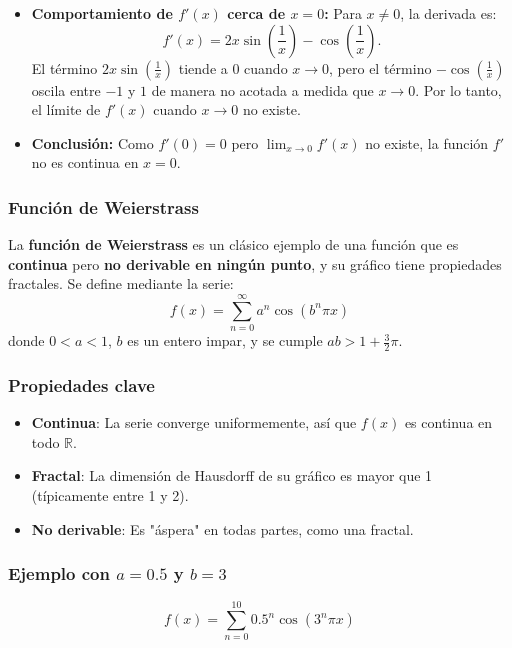 \documentclass[12pt, a4paper]{article}
\theoremstyle{rioplatense}
\begin{document}
\begin{itemize}
    \item \textbf{Comportamiento de \( f'(x) \) cerca de \( x = 0 \):}
    Para \( x \neq 0 \), la derivada es:
    \[
    f'(x) = 2x \sin\left(\frac{1}{x}\right) - \cos\left(\frac{1}{x}\right).
    \]
    El término \( 2x \sin\left(\frac{1}{x}\right) \) tiende a 0 cuando \( x \to 0 \), pero el término \( -\cos\left(\frac{1}{x}\right) \) oscila entre \(-1\) y \(1\) de manera no acotada a medida que \( x \to 0 \). Por lo tanto, el límite de \( f'(x) \) cuando \( x \to 0 \) no existe.

    \item \textbf{Conclusión:}
    Como \( f'(0) = 0 \) pero \( \lim_{x \to 0} f'(x) \) no existe, la función \( f' \) no es continua en \( x = 0 \).
\end{itemize}

\subsubsection{Función de Weierstrass}

La \textbf{función de Weierstrass} es un clásico ejemplo de una función que es \textbf{continua} pero \textbf{no derivable en ningún punto}, y su gráfico tiene propiedades fractales. Se define mediante la serie:
\[
f(x) = \sum_{n=0}^{\infty} a^n \cos(b^n \pi x)
\]
donde \(0 < a < 1\), \(b\) es un entero impar, y se cumple \(ab > 1 + \frac{3}{2}\pi\).

\subsubsection*{Propiedades clave}
\begin{itemize}
    \item \textbf{Continua}: La serie converge uniformemente, así que \(f(x)\) es continua en todo \(\mathbb{R}\).
    \item \textbf{Fractal}: La dimensión de Hausdorff de su gráfico es mayor que 1 (típicamente entre 1 y 2).
    \item \textbf{No derivable}: Es "áspera" en todas partes, como una fractal.
\end{itemize}

\subsubsection*{Ejemplo con \(a = 0.5\) y \(b = 3\)}
\[
f(x) = \sum_{n=0}^{10} 0.5^n \cos(3^n \pi x)
\]
\end{document}
